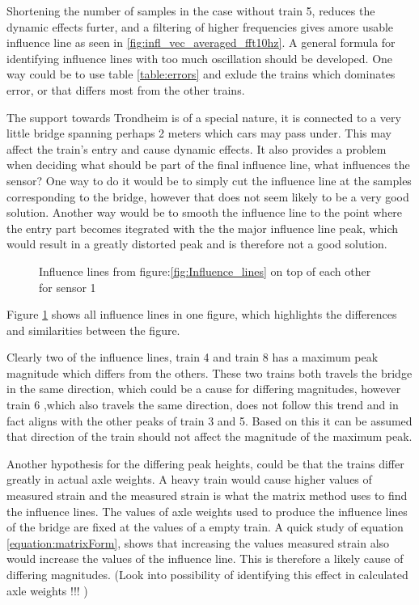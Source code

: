 Shortening the number of samples in the case without train 5, reduces the dynamic effects furter, and a filtering of higher frequencies gives amore usable influence line as seen in \ref{fig:infl_vec_averaged_fft10hz}.
A general formula for identifying influence lines with too much oscillation should be developed. One way could be to use table \ref{table:errors} and exlude the trains which dominates error, or that differs most from the other trains.

The support towards Trondheim is of a special nature, it is connected to a very little bridge spanning perhaps 2 meters which cars may pass under. This may affect the train's entry and cause dynamic effects. It also provides a problem when deciding what should be part of the final influence line, what influences the sensor?
One way to do it would be to simply cut the influence line at the samples corresponding to the bridge, however that does not seem likely to be a very good solution. Another way would be to smooth the influence line to the point where the entry part becomes itegrated with the the major influence line peak, which would result in a greatly distorted peak and is therefore not a good solution.
\begin{figure}[H]
	\begin{adjustbox}{center}
		
	\end{adjustbox}
	\caption{Influence lines from figure:\ref{fig:Influence_lines} on top of each other for sensor 1}
	\label{fig:infl_all_trains}
\end{figure}

Figure \ref{fig:infl_all_trains} shows all influence lines in one figure, which highlights the differences and similarities between the figure.

Clearly two of the influence lines, train 4 and train 8 has a maximum peak magnitude which differs from the others. These two trains both travels the bridge in the same direction, which could be a cause for differing magnitudes, however train 6 ,which also travels the same direction, does not follow this trend and in fact aligns with the other peaks of train 3 and 5. Based on this it can be assumed that direction of the train should not affect the magnitude of the maximum peak.

Another hypothesis for the differing peak heights, could be that the trains differ greatly in actual axle weights. A heavy train would cause higher values of measured strain and the measured strain is what the matrix method uses to find the influence lines. The values of axle weights used to produce the influence lines of the bridge are fixed at the values of a empty train. A quick study of equation \ref{equation:matrixForm}, shows that increasing the values measured strain also would increase the values of the influence line. This is therefore a likely cause of differing magnitudes. (Look into possibility of identifying this effect in calculated axle weights !!! )

